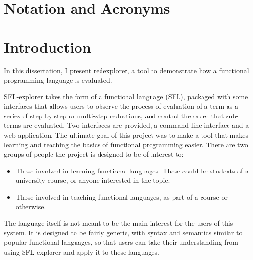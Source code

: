 \documentclass[
author={Kiran Sturt},
degree={BSc},
title={Implementing a Step by Step Evaluator for a Simple Functional Programming language},
unit={COMS30045},]{dissertation}
\begin{document}
\chapter*{Notation and Acronyms}


%

\mainmatter


\chapter{Introduction}
\label{chap:context}

In this dissertation, I present redexplorer, a tool to demonstrate how a functional programming language is evaluated.

SFL-explorer takes the form of a functional language (SFL), packaged with some interfaces that allows users to observe the process of evaluation of a term as a series of step by step or multi-step reductions, and control the order that sub-terms are evaluated. Two interfaces are provided, a command line interface and a web application. The ultimate goal of this project was to make a tool that makes learning and teaching the basics of functional programming easier. There are two groups of people the project is designed to be of interest to:
\begin{itemize}
    \item Those involved in learning functional languages. These could be students of a university course, or anyone interested in the topic.
    \item Those involved in teaching functional languages, as part of a course or otherwise.
\end{itemize}

The language itself is not meant to be the main interest for the users of this system. It is designed to be fairly generic, with syntax and semantics similar to popular functional languages, so that users can take their understanding from using SFL-explorer and apply it to these languages. 
\end{document}
